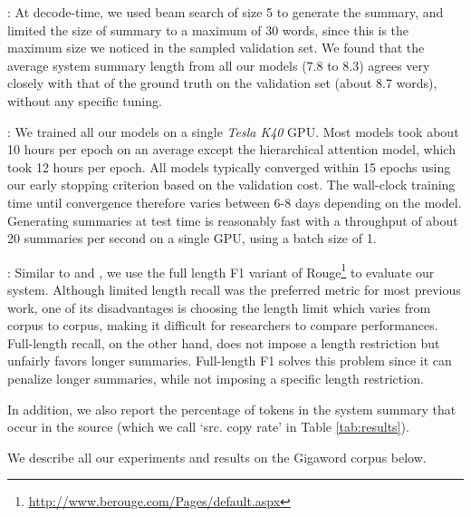 : At decode-time, we used beam search of size 5 to generate the summary, and limited the size of summary to a maximum of 30 words, since this is the maximum size we noticed in the sampled validation set. We found that the average system summary length from all our models (7.8 to 8.3) agrees very closely with that of the ground truth on the validation set (about 8.7 words), without any specific tuning. 

: We trained all our models on a single {\it Tesla K40} GPU. Most models took about 10 hours per epoch on an average except the hierarchical attention model, which took 12 hours per epoch. All models typically converged within 15 epochs using our early stopping criterion based on the validation cost. The wall-clock training time until convergence therefore varies between 6-8 days depending on the model. Generating summaries at test time is reasonably fast with a throughput of about 20 summaries per second on a single GPU, using a batch size of 1. 

: Similar to \cite{nallapati} and \cite{chopra}, we use the full length F1 variant of Rouge\footnote{\url{http://www.berouge.com/Pages/default.aspx}} to evaluate our system.
Although limited length recall was the preferred metric for most previous work, one of its disadvantages is choosing the length limit which varies from corpus to corpus, making it difficult for researchers to compare performances. Full-length recall, on the other hand, does not impose a length restriction but unfairly favors longer summaries. Full-length F1 solves this problem since it can penalize longer summaries, while not imposing a specific length restriction. 

In addition, we also report the percentage of tokens in the system summary that occur in the source (which we call `src. copy rate' in Table \ref{tab:results}). 

\noindent We describe all our experiments and results on the Gigaword corpus below.

